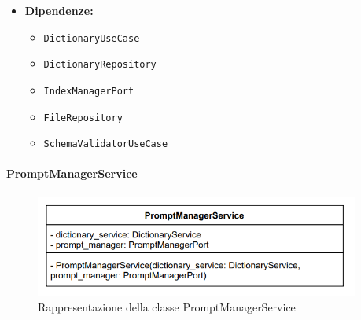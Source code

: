 \begin{itemize}
\begin{itemize}
    \end{itemize}
    \item \textbf{Dipendenze:}
    \begin{itemize}
        \item \texttt{DictionaryUseCase}
        \item \texttt{DictionaryRepository}
        \item \texttt{IndexManagerPort}
        \item \texttt{FileRepository}
        \item \texttt{SchemaValidatorUseCase}
    \end{itemize}
\end{itemize}

\paragraph{PromptManagerService} \label{PromptManagementService}
\begin{figure}[H]
    \centering
    \includegraphics[width=0.95\textwidth]{assets/Backend/prompt_manager_service.png}
    \caption{Rappresentazione della classe PromptManagerService}
  \end{figure}
